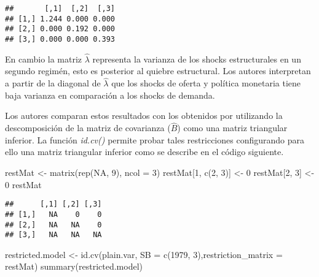\documentclass[
]{book}
\newenvironment{Shaded}{\begin{snugshade}}{\end{snugshade}}
\newcommand{\AttributeTok}[1]{\textcolor[rgb]{0.77,0.63,0.00}{#1}}
\newcommand{\ConstantTok}[1]{\textcolor[rgb]{0.00,0.00,0.00}{#1}}
\newcommand{\DecValTok}[1]{\textcolor[rgb]{0.00,0.00,0.81}{#1}}
\newcommand{\FunctionTok}[1]{\textcolor[rgb]{0.00,0.00,0.00}{#1}}
\newcommand{\NormalTok}[1]{#1}
\newcommand{\OtherTok}[1]{\textcolor[rgb]{0.56,0.35,0.01}{#1}}
\newcommand{\SpecialCharTok}[1]{\textcolor[rgb]{0.00,0.00,0.00}{#1}}
\begin{document}
\begin{Shaded}
\end{Shaded}

\begin{verbatim}
##       [,1]  [,2]  [,3]
## [1,] 1.244 0.000 0.000
## [2,] 0.000 0.192 0.000
## [3,] 0.000 0.000 0.393
\end{verbatim}

En cambio la matriz \(\hat{\lambda}\) representa la varianza de los shocks estructurales en un segundo regimén, esto es posterior al quiebre estructural. Los autores interpretan a partir de la diagonal de \(\hat{\lambda}\) que los shocks de oferta y política monetaria tiene baja varianza en comparación a los shocks de demanda.

Los autores comparan estos resultados con los obtenidos por \citet{Sims80} utilizando la descomposición de la matriz de covarianza (\(\hat{B}\)) como una matriz triangular inferior. La función \emph{id.cv()} permite
probar tales restricciones configurando para ello una matriz triangular inferior como se describe en el código siguiente.

\begin{Shaded}
\begin{Highlighting}[]
\NormalTok{restMat }\OtherTok{\textless{}{-}} \FunctionTok{matrix}\NormalTok{(}\FunctionTok{rep}\NormalTok{(}\ConstantTok{NA}\NormalTok{, }\DecValTok{9}\NormalTok{), }\AttributeTok{ncol =} \DecValTok{3}\NormalTok{)}
\NormalTok{restMat[}\DecValTok{1}\NormalTok{, }\FunctionTok{c}\NormalTok{(}\DecValTok{2}\NormalTok{, }\DecValTok{3}\NormalTok{)] }\OtherTok{\textless{}{-}} \DecValTok{0}
\NormalTok{restMat[}\DecValTok{2}\NormalTok{, }\DecValTok{3}\NormalTok{] }\OtherTok{\textless{}{-}} \DecValTok{0}
\NormalTok{restMat}
\end{Highlighting}
\end{Shaded}

\begin{verbatim}
##      [,1] [,2] [,3]
## [1,]   NA    0    0
## [2,]   NA   NA    0
## [3,]   NA   NA   NA
\end{verbatim}

\begin{Shaded}
\begin{Highlighting}[]
\NormalTok{restricted.model }\OtherTok{\textless{}{-}} \FunctionTok{id.cv}\NormalTok{(plain.var, }\AttributeTok{SB =} \FunctionTok{c}\NormalTok{(}\DecValTok{1979}\NormalTok{, }\DecValTok{3}\NormalTok{),}\AttributeTok{restriction\_matrix =}\NormalTok{ restMat)}
\FunctionTok{summary}\NormalTok{(restricted.model)}
\end{Highlighting}
\end{Shaded}
\end{document}
